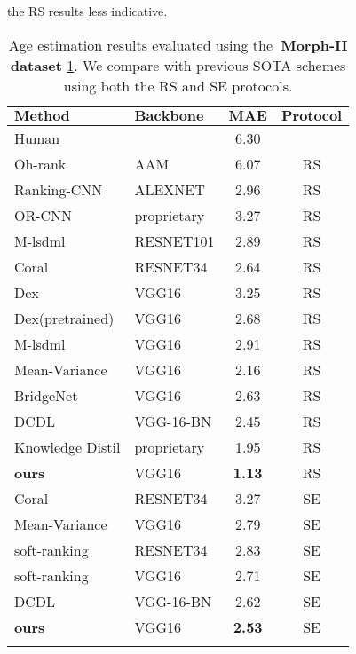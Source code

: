 \documentclass[10pt,journal]{IEEEtran}\usepackage{amsfonts}
\begin{document}
the RS results less indicative. \begin{table}[tbh]
\caption{Age estimation results evaluated using the\textbf{\ Morph-II dataset}
\ref{table:Morph-II}. We compare with previous SOTA schemes using both the RS
and SE protocols.}\label{table:Morph-II}
\centering
\renewcommand{\arraystretch}{1.3}
\begin{tabular}
[c]{@{}llcc}\toprule $\mathbf{Method}$ & $\mathbf{Backbone}$ & $\mathbf{MAE}$ &
$\mathbf{Protocol}$\\
\midrule Human \cite{6920084} &  & 6.30 & \\
Oh-rank\cite{chang2011ordinal} & AAM & 6.07 & RS\\
Ranking-CNN\cite{8099569} & ALEXNET & 2.96 & RS\\
OR-CNN\cite{7780901} & proprietary & 3.27 & RS\\
M-lsdml\cite{8017500} & RESNET101 & 2.89 & RS\\
Coral\cite{coral} & RESNET34 & 2.64 & RS\\
Dex\cite{7406390} & VGG16 & 3.25 & RS\\
Dex(pretrained)\cite{7406390} & VGG16 & 2.68 & RS\\
M-lsdml\cite{8017500} & VGG16 & 2.91 & RS\\
Mean-Variance\cite{Mean-Variance} & VGG16 & 2.16 & RS\\
BridgeNet\cite{8954134} & VGG16 & 2.63 & RS\\
DCDL\cite{9541205} & VGG-16-BN & 2.45 & RS\\
Knowledge Distil\cite{Dark_Knowledge} & proprietary & 1.95 & RS\\
\textbf{ours} & VGG16 & \textbf{1.13} & RS\\
\midrule Coral\cite{coral} & RESNET34 & 3.27 & SE\\
Mean-Variance\cite{Mean-Variance} & VGG16 & 2.79 & SE\\
soft-ranking\cite{9145576} & RESNET34 & 2.83 & SE\\
soft-ranking\cite{9145576} & VGG16 & 2.71 & SE\\
DCDL\cite{9541205} & VGG-16-BN & 2.62 & SE\\
\textbf{ours} & VGG16 & \textbf{2.53} & SE\\
\bottomrule &  &  &
\end{tabular}
\end{table}
\end{document}
